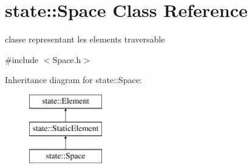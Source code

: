 \hypertarget{classstate_1_1_space}{}\section{state\+:\+:Space Class Reference}
\label{classstate_1_1_space}


classe representant les elements traversable  




{\ttfamily \#include $<$Space.\+h$>$}

Inheritance diagram for state\+:\+:Space\+:\begin{figure}[H]
\begin{center}
\leavevmode
\includegraphics[height=3.000000cm]{classstate_1_1_space}
\end{center}
\end{figure}
